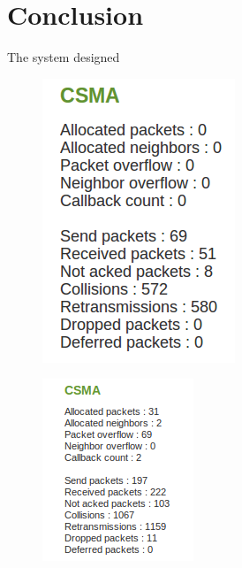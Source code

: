 \section{Conclusion}

The system designed

\begin{figure}[!h]
	\begin{center} 	
		\includegraphics[width=0.5\linewidth]{csma}
		\caption{}
		\label{fig:csma}
	\end{center}
\end{figure} 

\begin{figure}[!h]
	\begin{center} 	
		\includegraphics[width=0.5\linewidth]{csma2}
		\caption{}
		\label{fig:csma1}
	\end{center}
\end{figure} 